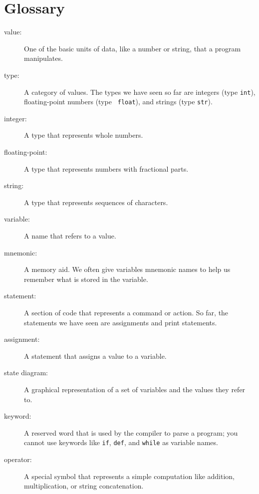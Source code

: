\documentclass[10pt]{book}
\begin{document}


\section{Glossary}

\begin{description}

\item[value:]  One of the basic units of data, like a number or string, 
that a program manipulates.

\item[type:] A category of values.  The types we have seen so far
are integers (type {\tt int}), floating-point numbers (type {\tt
float}), and strings (type {\tt str}).

\item[integer:] A type that represents whole numbers.

\item[floating-point:] A type that represents numbers with fractional
parts.

\item[string:] A type that represents sequences of characters.

\item[variable:]  A name that refers to a value.

\item[mnemonic:] A memory aid. We often give variables mnemonic names
to help us remember what is stored in the variable.

\item[statement:]  A section of code that represents a command or action.  So
far, the statements we have seen are assignments and print statements.

\item[assignment:]  A statement that assigns a value to a variable.

\item[state diagram:]  A graphical representation of a set of variables and the
values they refer to.

\item[keyword:]  A reserved word that is used by the compiler to parse a
program; you cannot use keywords like {\tt if}, {\tt  def}, and {\tt while} as
variable names.

\item[operator:]  A special symbol that represents a simple computation like
addition, multiplication, or string concatenation.


\end{description}
\end{document}
